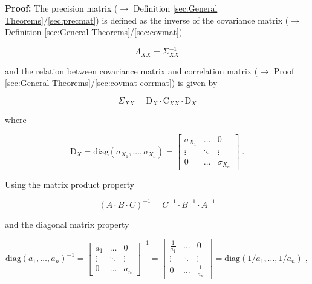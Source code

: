 \documentclass[a4paper,12pt,twoside]{book}
\begin{document}
\vspace{1em}
\textbf{Proof:} The precision matrix ($\rightarrow$ Definition \ref{sec:General Theorems}/\ref{sec:precmat}) is defined as the inverse of the covariance matrix ($\rightarrow$ Definition \ref{sec:General Theorems}/\ref{sec:covmat})

\begin{equation} \label{eq:precmat-corrmat-precmat-covmat}
\Lambda_{XX} = \Sigma_{XX}^{-1}
\end{equation}

and the relation between covariance matrix and correlation matrix ($\rightarrow$ Proof \ref{sec:General Theorems}/\ref{sec:covmat-corrmat}) is given by

\begin{equation} \label{eq:precmat-corrmat-covmat-corrmat}
\Sigma_{XX} = \mathrm{D}_X \cdot \mathrm{C}_{XX} \cdot \mathrm{D}_X
\end{equation}

where

\begin{equation} \label{eq:precmat-corrmat-diagmat}
\mathrm{D}_X = \mathrm{diag}(\sigma_{X_1},\ldots,\sigma_{X_n}) =
\begin{bmatrix}
\sigma_{X_1} & \ldots & 0 \\
\vdots & \ddots & \vdots \\
0 & \ldots & \sigma_{X_n}
\end{bmatrix} \; .
\end{equation}

Using the matrix product property

\begin{equation} \label{eq:precmat-corrmat-matprod-inv}
\left(A \cdot B \cdot C\right)^{-1} = C^{-1} \cdot B^{-1} \cdot A^{-1}
\end{equation}

and the diagonal matrix property

\begin{equation} \label{eq:precmat-corrmat-diagmat-inv}
\mathrm{diag}(a_1,\ldots,a_n)^{-1} =
\begin{bmatrix}
a_1 & \ldots & 0 \\
\vdots & \ddots & \vdots \\
0 & \ldots & a_n
\end{bmatrix}^{-1} =
\begin{bmatrix}
\frac{1}{a_1} & \ldots & 0 \\
\vdots & \ddots & \vdots \\
0 & \ldots & \frac{1}{a_n}
\end{bmatrix} =
\mathrm{diag}(1/a_1,\ldots,1/a_n) \; ,
\end{equation}
\end{document}
